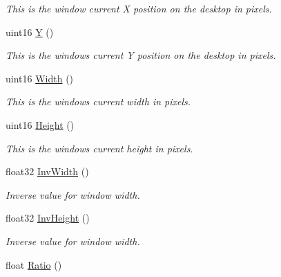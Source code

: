 \begin{DoxyCompactItemize}
\begin{DoxyCompactList}\small\item\em This is the window current X position on the desktop in pixels. \end{DoxyCompactList}\item 
\hypertarget{classc_window_a27e8cb14c7e0e034df92bd05d7bba60a}{
uint16 \hyperlink{classc_window_a27e8cb14c7e0e034df92bd05d7bba60a}{Y} ()}
\label{classc_window_a27e8cb14c7e0e034df92bd05d7bba60a}

\begin{DoxyCompactList}\small\item\em This is the windows current Y position on the desktop in pixels. \end{DoxyCompactList}\item 
\hypertarget{classc_window_a6537654031097136429654535d5a19af}{
uint16 \hyperlink{classc_window_a6537654031097136429654535d5a19af}{Width} ()}
\label{classc_window_a6537654031097136429654535d5a19af}

\begin{DoxyCompactList}\small\item\em This is the windows current width in pixels. \end{DoxyCompactList}\item 
\hypertarget{classc_window_a7f8a5fad4f3a5923b343cb212cbf2083}{
uint16 \hyperlink{classc_window_a7f8a5fad4f3a5923b343cb212cbf2083}{Height} ()}
\label{classc_window_a7f8a5fad4f3a5923b343cb212cbf2083}

\begin{DoxyCompactList}\small\item\em This is the windows current height in pixels. \end{DoxyCompactList}\item 
\hypertarget{classc_window_a0c98061c3bf2c3e8a900b559947f6a5e}{
float32 \hyperlink{classc_window_a0c98061c3bf2c3e8a900b559947f6a5e}{InvWidth} ()}
\label{classc_window_a0c98061c3bf2c3e8a900b559947f6a5e}

\begin{DoxyCompactList}\small\item\em Inverse value for window width. \end{DoxyCompactList}\item 
\hypertarget{classc_window_a090f203d24e0f188afcc05ad6fd78e6e}{
float32 \hyperlink{classc_window_a090f203d24e0f188afcc05ad6fd78e6e}{InvHeight} ()}
\label{classc_window_a090f203d24e0f188afcc05ad6fd78e6e}

\begin{DoxyCompactList}\small\item\em Inverse value for window width. \end{DoxyCompactList}\item 
\hypertarget{classc_window_a309e455488789cb3e28e22ce44cbeb03}{
float \hyperlink{classc_window_a309e455488789cb3e28e22ce44cbeb03}{Ratio} ()}
\label{classc_window_a309e455488789cb3e28e22ce44cbeb03}


\end{DoxyCompactItemize}
